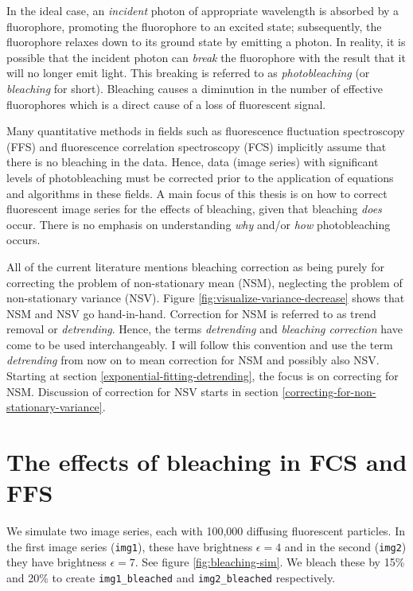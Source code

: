 \documentclass[12pt,]{book}
\theoremstyle{definition}
\theoremstyle{definition}
\theoremstyle{definition}
\theoremstyle{remark}
\let\BeginKnitrBlock\begin \let\EndKnitrBlock\end
\begin{document}
In the ideal case, an \emph{incident} photon of appropriate wavelength
is absorbed by a fluorophore, promoting the fluorophore to an excited
state; subsequently, the fluorophore relaxes down to its ground state by
emitting a photon. In reality, it is possible that the incident photon
can \emph{break} the fluorophore with the result that it will no longer
emit light. This breaking is referred to as \emph{photobleaching} (or
\emph{bleaching} for short). Bleaching causes a diminution in the number
of effective fluorophores which is a direct cause of a loss of
fluorescent signal.

Many quantitative methods in fields such as fluorescence fluctuation
spectroscopy (FFS) and fluorescence correlation spectroscopy (FCS)
implicitly assume that there is no bleaching in the data. Hence, data
(image series) with significant levels of photobleaching must be
corrected prior to the application of equations and algorithms in these
fields. A main focus of this thesis is on how to correct fluorescent
image series for the effects of bleaching, given that bleaching
\emph{does} occur. There is no emphasis on understanding \emph{why}
and/or \emph{how} photobleaching occurs.

\BeginKnitrBlock{remark}
\iffalse{} {Remark. } \fi{}All of the current literature mentions
bleaching correction as being purely for correcting the problem of
non-stationary mean (NSM), neglecting the problem of non-stationary
variance (NSV). Figure \ref{fig:visualize-variance-decrease} shows that
NSM and NSV go hand-in-hand. Correction for NSM is referred to as trend
removal or \emph{detrending}. Hence, the terms \emph{detrending} and
\emph{bleaching correction} have come to be used interchangeably. I will
follow this convention and use the term \emph{detrending} from now on to
mean correction for NSM and possibly also NSV. Starting at section
\ref{exponential-fitting-detrending}, the focus is on correcting for
NSM. Discussion of correction for NSV starts in section
\ref{correcting-for-non-stationary-variance}.
\EndKnitrBlock{remark}

\section{The effects of bleaching in FCS and
FFS}\label{the-effects-of-bleaching-in-fcs-and-ffs}

We simulate two image series, each with 100,000 diffusing fluorescent
particles. In the first image series (\texttt{img1}), these have
brightness \(\epsilon = 4\) and in the second (\texttt{img2}) they have
brightness \(\epsilon = 7\). See figure \ref{fig:bleaching-sim}. We
bleach these by 15\% and 20\% to create \texttt{img1\_bleached} and
\texttt{img2\_bleached} respectively.
\end{document}
